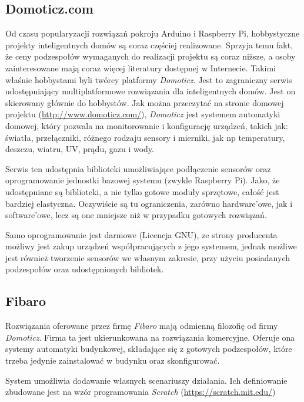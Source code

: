 \documentclass[eng,oneside]{mgr}
\begin{document}
\subsection{Domoticz.com}
Od czasu popularyzacji rozwiązań pokroju Arduino i Raspberry Pi, hobbystyczne projekty inteligentnych domów są coraz częściej realizowane. Sprzyja temu fakt, że ceny podzespołów wymaganych do realizacji projektu są coraz niższe, a osoby zainteresowane mają coraz więcej literatury dostępnej w Internecie. Takimi właśnie hobbystami byli twórcy platformy \textit{Domoticz}. Jest to zagraniczny serwis udostępniający multiplatformowe rozwiązania dla inteligentnych domów. Jest on skierowany głównie do hobbystów. Jak można przeczytać na stronie domowej projektu (\url{http://www.domoticz.com/}), \textit{Domoticz} jest systemem automatyki domowej, który pozwala na monitorowanie i konfigurację urządzeń, takich jak: światła, przełączniki, różnego rodzaju sensory i mierniki, jak np temperatury, deszczu, wiatru, UV, prądu, gazu i wody.

Serwis ten udostępnia biblioteki umożliwiające podłączenie sensorów oraz oprogramowanie jednostki bazowej systemu (zwykle Raspberry Pi). Jako, że udostępniane są biblioteki, a nie tylko gotowe moduły sprzętowe, całość jest bardziej elastyczna. Oczywiście są tu ograniczenia, zarówno hardware'owe, jak i software'owe, lecz są one mniejsze niż w przypadku gotowych rozwiązań.

Samo oprogramowanie jest darmowe (Licencja GNU), ze strony producenta możliwy jest zakup urządzeń współpracujących z jego systemem, jednak możliwe jest również tworzenie sensorów we własnym zakresie, przy użyciu posiadanych podzespołów oraz udostępnionych bibliotek.
\subsection{Fibaro}                                                                                              
Rozwiązania oferowane przez firmę \textit{Fibaro} mają odmienną filozofię od firmy \textit{Domoticz}. Firma ta jest ukierunkowana na rozwiązania komercyjne. Oferuje ona systemy automatyki budynkowej, składające się z gotowych podzespołów, które trzeba jedynie zainstalować w budynku oraz skonfigurować.

System umożliwia dodawanie własnych scenariuszy działania. Ich definiowanie zbudowane jest na wzór programowania \textit{Scratch} (\url{https://scratch.mit.edu/})
\end{document}
